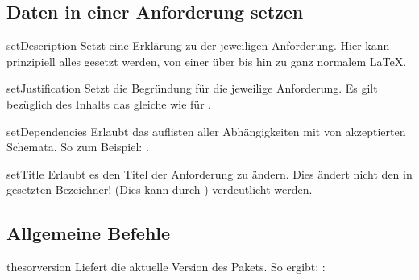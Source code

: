 \documentclass{sopra-base}
\begin{document}
\subsection{Daten in einer Anforderung setzen}

 

\begin{command}{setDescription}{}
    Setzt eine Erklärung zu der jeweiligen Anforderung. Hier kann prinzipiell alles gesetzt werden, von einer  über  bis hin zu ganz normalem LaTeX.
\end{command}

\begin{command}{setJustification}{}
    Setzt die Begründung für die jeweilige Anforderung. Es gilt bezüglich des Inhalts das gleiche wie für .
\end{command}

\begin{command}{setDependencies}{}
    Erlaubt das auflisten aller Abhängigkeiten mit von  akzeptierten Schemata. So zum Beispiel: .
\end{command}

\begin{command}{setTitle}{}
    Erlaubt es den Titel der Anforderung zu ändern. Dies ändert nicht den in  gesetzten Bezeichner! (Dies kann durch ) verdeutlicht werden. 
\end{command}

\subsection{Allgemeine Befehle}

\begin{command}{thesorversion}{}
    Liefert die aktuelle Version des Pakets. So ergibt: : \thesorversion\\
\end{command}
\end{document}
